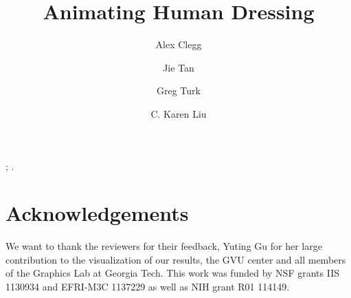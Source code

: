 \documentclass[conference]{acmsiggraph}
\title{Animating Human Dressing}
\author{Alex Clegg  \and Jie Tan  %
\and  Greg Turk  \and  C. Karen Liu }
\affiliation{Georgia Institute of Technology}
\begin{document}


\maketitle


\begin{abstract}

\end{abstract}

\begin{CRcatlist}
  ;
  .
\end{CRcatlist}

\keywordlist
\copyrightspace










\section*{Acknowledgements}

We want to thank the reviewers for their feedback, Yuting Gu
for her large contribution to the visualization of our results, the GVU center and all members of the Graphics Lab at Georgia Tech. This work was funded by NSF grants IIS 1130934 and EFRI-M3C 1137229 as well as NIH grant R01 114149.




%
\end{document}
